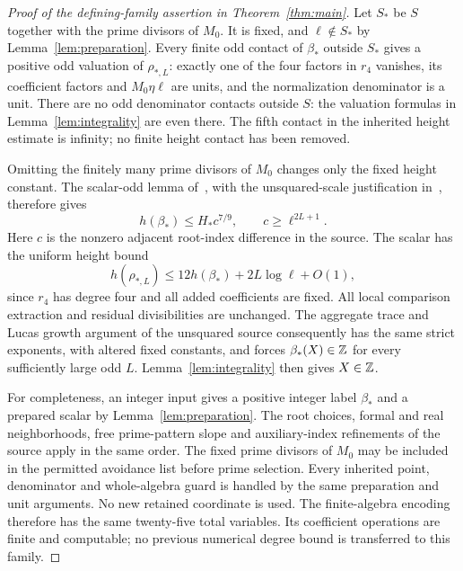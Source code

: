 \documentclass[11pt,a4paper]{article}
\begin{document}
\begin{proof}[Proof of the defining-family assertion in Theorem~\ref{thm:main}]
Let $S_*$ be $S$ together with the prime divisors of $M_0$.
It is fixed, and $\ell\notin S_*$ by Lemma~\ref{lem:preparation}.
Every finite odd contact of $\beta_*$ outside $S_*$ gives a positive
odd valuation of $\rho_{*,L}$: exactly one of the four factors in
$r_4$ vanishes, its coefficient factors and $M_0\eta\ell$ are units,
and the normalization denominator is a unit. There are no odd
denominator contacts outside $S$: the valuation formulas in
Lemma~\ref{lem:integrality} are even there. The fifth contact in the
inherited height estimate is infinity; no finite height contact has
been removed.

Omitting the finitely many prime divisors of $M_0$ changes only the
fixed height constant. The scalar-odd lemma of~\cite{General}, with
the unsquared-scale justification in~\cite{UnitNorm}, therefore gives
\[
               h(\beta_*)\le H_*c^{7/9},\qquad c\ge\ell^{2L+1}.
\]
Here $c$ is the nonzero adjacent root-index difference in the source.
The scalar has the uniform height bound
\[
               h(\rho_{*,L})\le12h(\beta_*)+2L\log\ell+O(1),
\]
since $r_4$ has degree four and all added coefficients are fixed.
All local comparison extraction and residual divisibilities are
unchanged. The aggregate trace and Lucas growth argument of the
unsquared source consequently has the same strict exponents, with
altered fixed constants, and forces $\beta_*(X)\in\mathbb Z$ for every
sufficiently large odd $L$. Lemma~\ref{lem:integrality} then gives
$X\in\mathbb Z$.

For completeness, an integer input gives a positive integer label
$\beta_*$ and a prepared scalar by Lemma~\ref{lem:preparation}.
The root choices, formal and real neighborhoods, free prime-pattern
slope and auxiliary-index refinements of the source apply in the
same order. The fixed prime divisors of $M_0$ may be included in the
permitted avoidance list before prime selection. Every inherited
point, denominator and whole-algebra guard is handled by the same
preparation and unit arguments. No new retained coordinate is used.
The finite-algebra encoding therefore has the same twenty-five total
variables. Its coefficient operations are finite and computable;
no previous numerical degree bound is transferred to this family.
\end{proof}
\end{document}

